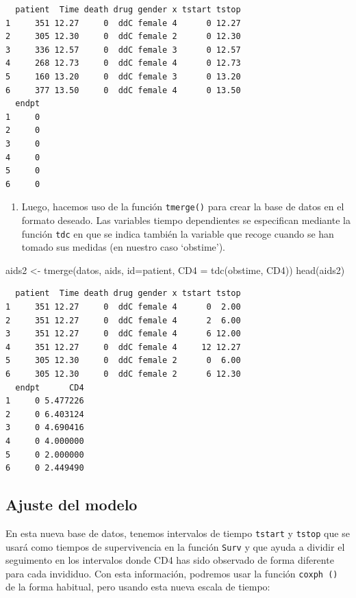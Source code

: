 \documentclass[
]{book}
\newenvironment{Shaded}{\begin{snugshade}}{\end{snugshade}}
\newcommand{\AttributeTok}[1]{\textcolor[rgb]{0.77,0.63,0.00}{#1}}
\newcommand{\FunctionTok}[1]{\textcolor[rgb]{0.00,0.00,0.00}{#1}}
\newcommand{\NormalTok}[1]{#1}
\newcommand{\OtherTok}[1]{\textcolor[rgb]{0.56,0.35,0.01}{#1}}
\providecommand{\tightlist}{%
  \setlength{\itemsep}{0pt}\setlength{\parskip}{0pt}}
\begin{document}
\begin{verbatim}
  patient  Time death drug gender x tstart tstop
1     351 12.27     0  ddC female 4      0 12.27
2     305 12.30     0  ddC female 2      0 12.30
3     336 12.57     0  ddC female 3      0 12.57
4     268 12.73     0  ddC female 4      0 12.73
5     160 13.20     0  ddC female 3      0 13.20
6     377 13.50     0  ddC female 4      0 13.50
  endpt
1     0
2     0
3     0
4     0
5     0
6     0
\end{verbatim}

\begin{enumerate}
\def\labelenumi{\arabic{enumi}.}
\setcounter{enumi}{1}
\tightlist
\item
  Luego, hacemos uso de la función \texttt{tmerge()} para crear la base de datos en el formato deseado. Las variables tiempo dependientes se especifican mediante la función \texttt{tdc} en que se indica también la variable que recoge cuando se han tomado sus medidas (en nuestro caso `obstime').
\end{enumerate}

\begin{Shaded}
\begin{Highlighting}[]
\NormalTok{aids2 }\OtherTok{\textless{}{-}} \FunctionTok{tmerge}\NormalTok{(datos, aids, }\AttributeTok{id=}\NormalTok{patient, }\AttributeTok{CD4 =} \FunctionTok{tdc}\NormalTok{(obstime, CD4))}
\FunctionTok{head}\NormalTok{(aids2)}
\end{Highlighting}
\end{Shaded}

\begin{verbatim}
  patient  Time death drug gender x tstart tstop
1     351 12.27     0  ddC female 4      0  2.00
2     351 12.27     0  ddC female 4      2  6.00
3     351 12.27     0  ddC female 4      6 12.00
4     351 12.27     0  ddC female 4     12 12.27
5     305 12.30     0  ddC female 2      0  6.00
6     305 12.30     0  ddC female 2      6 12.30
  endpt      CD4
1     0 5.477226
2     0 6.403124
3     0 4.690416
4     0 4.000000
5     0 2.000000
6     0 2.449490
\end{verbatim}

\hypertarget{ajuste-del-modelo}{%
\subsection{Ajuste del modelo}\label{ajuste-del-modelo}}

En esta nueva base de datos, tenemos intervalos de tiempo \texttt{tstart} y \texttt{tstop} que se usará como tiempos de supervivencia en la función \texttt{Surv} y que ayuda a dividir el seguimento en los intervalos donde CD4 has sido observado de forma diferente para cada invididuo. Con esta información, podremos usar la función \texttt{coxph\ ()} de la forma habitual, pero usando esta nueva escala de tiempo:
\end{document}
